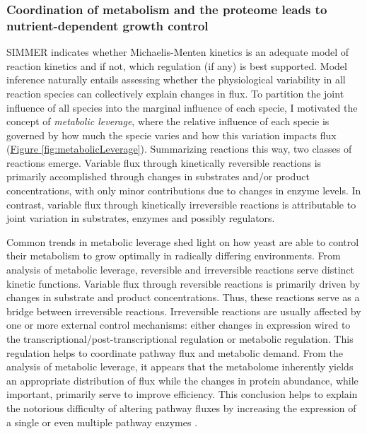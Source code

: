 \subsubsection{Coordination of metabolism and the proteome leads to nutrient-dependent growth control}

SIMMER indicates whether Michaelis-Menten kinetics is an adequate model of reaction kinetics and if not, which regulation (if any) is best supported. Model inference naturally entails assessing whether the physiological variability in all reaction species can collectively explain changes in flux. To partition the joint influence of all species into the marginal influence of each specie, I motivated the concept of \textit{metabolic leverage}, where the relative influence of each specie is governed by how much the specie varies and how this variation impacts flux (\hyperref[fig:metabolicLeverage]{Figure \ref{fig:metabolicLeverage}}). Summarizing reactions this way, two classes of reactions emerge. Variable flux through kinetically reversible reactions is primarily accomplished through changes in substrates and/or product concentrations, with only minor contributions due to changes in enzyme levels.  In contrast, variable flux through kinetically irreversible reactions is attributable to joint variation in substrates, enzymes and possibly regulators.

Common trends in metabolic leverage shed light on how yeast are able to control their metabolism to grow optimally in radically differing environments. From analysis of metabolic leverage, reversible and irreversible reactions serve distinct kinetic functions. Variable flux through reversible reactions is primarily driven by changes in substrate and product concentrations. Thus, these reactions serve as a bridge between irreversible reactions. Irreversible reactions are usually affected by one or more external control mechanisms: either changes in expression wired to the transcriptional/post-transcriptional regulation or metabolic regulation. This regulation helps to coordinate pathway flux and metabolic demand. From the analysis of metabolic leverage, it appears that the metabolome inherently yields an appropriate distribution of flux while the changes in protein abundance, while important, primarily serve to improve efficiency. This conclusion helps to explain the notorious difficulty of altering pathway fluxes by increasing the expression of a single or even multiple pathway enzymes \cite{CornishBowden:1995fy,Schaaff:1989dl,Hauf:2000vu,Fell:1997wg}. 

